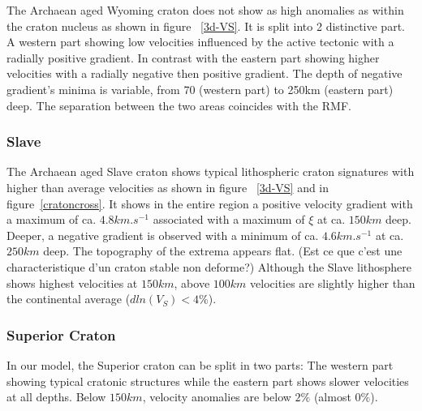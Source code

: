 \documentclass[12pt]{article}
\begin{document}
The Archaean aged Wyoming craton does not show as high anomalies as within the craton nucleus as shown in figure ~\ref{3d-VS}. 
It is split into 2 distinctive part. A western part showing low velocities influenced by the active tectonic with a radially positive gradient. 
In contrast with the eastern part showing higher velocities with a radially negative then positive gradient. 
The depth of negative gradient's minima is variable, from 70 (western part) to 250km (eastern part) deep. 
The separation between the two areas coincides with the RMF.

\subsubsection{Slave}




	The Archaean aged Slave craton shows typical lithospheric craton signatures with higher than average velocities as shown in figure ~\ref{3d-VS} and in figure~\ref{cratoncross}. 
	It shows in the entire region a positive velocity gradient with a maximum of ca. $4.8km.s^{-1}$ associated with a maximum of $\xi$ at ca. $150km$ deep.
	Deeper, a negative gradient is observed with a minimum of ca. $4.6km.s^{-1}$ at ca. $250km$ deep. 
	The topography of the extrema appears flat. (Est ce que c'est une characteristique d'un craton stable non deforme?)
	Although the Slave lithosphere shows highest velocities at $150km$, above $100km$ velocities are slightly higher than the continental average ($dln(V_S)< 4\%$).

\subsubsection{Superior Craton}
	In our model, the Superior craton can be split in two parts: The western part showing typical cratonic structures while the eastern part shows slower velocities at all depths. Below $150km$, velocity anomalies are below $2\%$ (almost $0\%$). 
\end{document}
